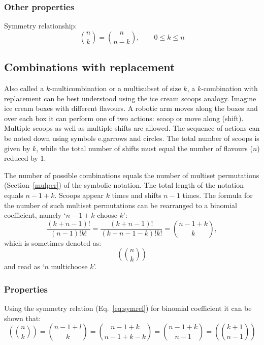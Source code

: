 \documentclass{article}
\makeatletter
\newcommand*{\eg}{e.g\@ifnextchar{.}{}{.\@\xspace}}
\makeatother
\begin{document}
\subsubsection{Other properties}

Symmetry relationship:
%
\begin{equation}
    \label{eq:symrel}
    \binom{n}{k} = \binom{n}{n-k}, \qquad 0 \le k \le n
\end{equation}

\subsection{Combinations with replacement}

Also called a $k$\nobreakdash-\hspace{0pt}multicombination or a multisubset of size $k$, a $k$\nobreakdash-\hspace{0pt}combination with replacement can be best understood using the ice cream scoops analogy.\cite{mathsisfun}
Imagine ice cream boxes with different flavours.
A robotic arm moves along the boxes and over each box it can perform one of two actions: scoop or move along (shift).
Multiple scoops as well as multiple shifts are allowed.
The sequence of actions can be noted down using symbols \eg arrows and circles.
The total number of scoops is given by $k$, while the total number of shifts must equal the number of flavours ($n$) reduced by 1.

The number of possible combinations equals the number of multiset permutations (Section~\ref{mulper}) of the symbolic notation.
The total length of the notation equals $n-1+k$.
Scoops appear $k$ times and shifts $n-1$ times.
The formula for the number of such multiset permutations can be rearranged to a binomial coefficient, namely `$n-1+k$ choose $k$':
%
\begin{equation}
    \frac{(k+n-1)!}{(n-1)!k!} = \frac{(k+n-1)!}{(k+n-1-k)!k!} = \binom{n-1+k}{k},
\end{equation}
%
which is sometimes denoted as:
%
\begin{equation*}
    \left(\!\!\!\binom{n}{k}\!\!\!\right)
\end{equation*}
%
and read as `$n$ multichoose $k$'.

\subsubsection{Properties}

Using the symmetry relation (Eq.~\ref{eq:symrel}) for binomial coefficient it can be shown that:
%
\begin{equation}
    \left(\!\!\!\binom{n}{k}\!\!\!\right) = \binom{n-1+l}{k} = \binom{n-1+k}{n-1+k-k} = \binom{n-1+k}{n-1} = \left(\!\!\!\binom{k+1}{n-1}\!\!\!\right)
\end{equation}
\end{document}
